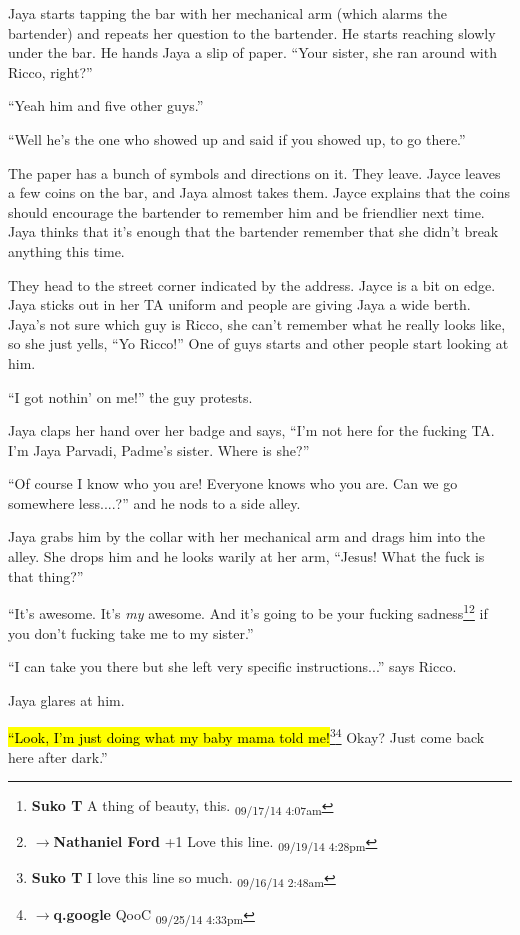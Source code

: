Jaya starts tapping the bar with her mechanical arm (which alarms the bartender) and repeats her question to the bartender.  He starts reaching slowly under the bar.  He hands Jaya a slip of paper.  ``Your sister, she ran around with Ricco, right?''

``Yeah him and five other guys.''

``Well he's the one who showed up and said if you showed up, to go there.''

The paper has a bunch of symbols and directions on it.  They leave.  Jayce leaves a few coins on the bar, and Jaya almost takes them.  Jayce explains that the coins should encourage the bartender to remember him and be friendlier next time.  Jaya thinks that it's enough that the bartender remember that she didn't break anything this time.



They head to the street corner indicated by the address.  Jayce is a bit on edge.  Jaya sticks out in her TA uniform and people are giving Jaya a wide berth.  Jaya's not sure which guy is Ricco, she can't remember what he really looks like, so she just yells, ``Yo Ricco!''  One of guys starts and other people start looking at him.

``I got nothin' on me!'' the guy protests.

Jaya claps her hand over her badge and says, ``I'm not here for the fucking TA. I'm Jaya Parvadi, Padme's sister.  Where is she?''

``Of course I know who you are!  Everyone knows who you are.  Can we go somewhere less....?'' and he nods to a side alley.

Jaya grabs him by the collar with her mechanical arm and drags him into the alley.  She drops him and he looks warily at her arm, ``Jesus! What the fuck is that thing?''

``It's awesome.  It's \textit{my} awesome.  And it's going to be your fucking sadness\footnote{\textbf{Suko T }A thing of beauty, this. \textsubscript{09/17/14 4:07am}}\footnote{$\rightarrow$\textbf{Nathaniel Ford }+1 Love this line. \textsubscript{09/19/14 4:28pm}} if you don't fucking take me to my sister.''

``I can take you there but she left very specific instructions...'' says Ricco.

Jaya glares at him.

\hl{``Look, I'm just doing what my baby mama told me!}\footnote{\textbf{Suko T }I love this line so much. \textsubscript{09/16/14 2:48am}}\footnote{$\rightarrow$\textbf{q.google }QooC \textsubscript{09/25/14 4:33pm}}  Okay?  Just come back here after dark.''

